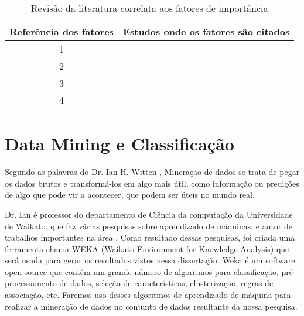 \begin{table}[h]
	\caption{Revisão da literatura correlata aos fatores de importância}
	\label{tabela_referencias}
	\def\arraystretch{1.5}
	\begin{tabular}{|c|l|}
		\hline
		\multicolumn{1}{|l|}{\textbf{Referência dos fatores}} & \textbf{Estudos onde os fatores são citados}                                                                                                                                                      \\ \hline
		1                                                     & \cite{Chatzoglou1997,Cole1995,Jones1986,Maxwell2000,Banker1991,Boehm2000,Brooks1981,Finnie1993,Jones2000,Lakhanpal1993,Scudder1991,Turcotte2004,Vosburgh1984,Walston1977,Wohlin1995,Wohlin2001} \\ \hline
		2                                                     & \cite{Alper2000,Boehm2000,Chatzoglou1997,Lakhanpal1993,Rasch1991,Scudder1991,Vosburgh1984,Walston1977,Wohlin1995,Lalsing2012}                                                                   \\ \hline
		3                                                     & \cite{Chiavenato2008,Lalsing2012,FariaSueli2005,Dutra2004,Fleury2001}                                                                                                                         \\ \hline
		4                                                     & \cite{Lalsing2012,Melo2011,FariaSueli2005,Schwaber2004,Coram2005}                                                                                                                               \\ \hline
	\end{tabular}
\end{table}

\section{Data Mining e Classificação}
Segundo as palavras do Dr. Ian H. Witten \cite{Holmes},  Mineração de dados  se trata de pegar os dados brutos e transformá-los em algo mais útil, como informação ou predições de algo que pode vir a acontecer, que podem ser úteis no mundo real.

Dr. Ian é professor do departamento de Ciência da computação da Universidade de Waikato, que faz várias pesquisas sobre aprendizado de máquinas, e autor de trabalhos importantes na área \cite{Witten2005}. Como resultado dessas pesquisas, foi criada uma ferramenta chama WEKA (Waikato Environment for Knowledge Analysis)\cite{Holmes}  que será usada para gerar os resultados vistos nessa dissertação. Weka é um software open-source que contém um grande número de algoritmos para classificação, pré-processamento de dados, seleção de características, clusterização, regras de associação, etc. Faremos uso desses algoritmos de aprendizado de máquina para realizar a mineração de dados no conjunto de dados resultante da nossa pesquisa.

